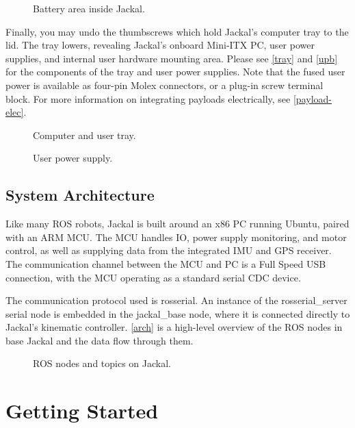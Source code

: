 \documentclass[]{clearpath-manual}
\begin{document}
\begin{figure}[ht]
  \centering
  \placeholder{9cm}{5cm}
  \caption{Battery area inside Jackal.}
  \label{int}
\end{figure}

Finally, you may undo the thumbscrews which hold Jackal's computer tray to the lid. The tray lowers,
revealing Jackal's onboard Mini-ITX PC, user power supplies, and internal user hardware mounting area.
Please see \autoref{tray} and \autoref{upb} for the components of the tray and user power supplies.
Note that the fused user power is available as four-pin Molex connectors, or a plug-in screw terminal
block. For more information on integrating payloads electrically, see \autoref{payload-elec}.

\begin{figure}[pt]
  \centering
  \placeholder{12cm}{8cm}
  \caption{Computer and user tray.}
  \label{tray}
\end{figure}

\begin{figure}[pb]
  \centering
  \placeholder{12cm}{8cm}
  \caption{User power supply.}
  \label{upb}
\end{figure}

\subsection{System Architecture}

Like many ROS robots, Jackal is built around an x86 PC running Ubuntu, paired with an
ARM MCU. The MCU handles IO, power supply monitoring, and motor control, as well as
supplying data from the integrated IMU and GPS receiver. The communication channel
between the MCU and PC is a Full Speed USB connection, with the MCU operating as a
standard serial CDC device.

The communication protocol used is rosserial. An instance of the rosserial\_server
serial node is embedded in the jackal\_base node, where it is connected directly to
Jackal's kinematic controller. \autoref{arch} is a high-level overview of the ROS
nodes in base Jackal and the data flow through them.

\begin{figure}[hb]
  \centering
  \placeholder{16cm}{18cm}
  \caption{ROS nodes and topics on Jackal.}
  \label{arch}
\end{figure}

\section{Getting Started}
\end{document}
